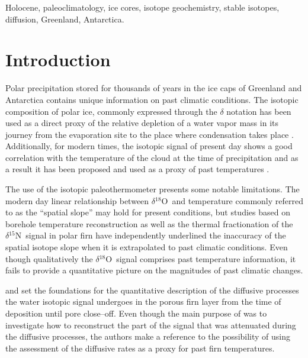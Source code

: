 \documentclass[11pt, draftcls, onecolumn]{IEEEtran} %
\numberwithin{equation}{section}
\numberwithin{table}{section}
\numberwithin{figure}{section}
\newcommand{\delOx}{$\delta{}^{18}\mathrm{O}$}
\newcommand{\delN}{$\delta{}^{15}\mathrm{N}$}
\begin{document}

\begin{IEEEkeywords} 
Holocene, paleoclimatology, ice cores, isotope geochemistry, stable isotopes, diffusion, Greenland, Antarctica.	
\end{IEEEkeywords}



\section{Introduction} %
\label{Intro}
Polar precipitation stored for thousands of years in the ice caps of Greenland and Antarctica
contains unique information on past climatic conditions. The isotopic composition 
of polar ice, commonly expressed
through the $\delta$ notation
has been used as a direct proxy of the relative depletion of a water vapor mass in its 
journey from the evaporation site to the place where condensation takes place \citep{Epstein1951, IAEA}. 
Additionally, for modern times, the isotopic signal of present day shows a good correlation with the temperature of the cloud at the
time of precipitation \citep{Dansgaard2, Dansgaard} and as a result it has been proposed and used 
as a proxy of past temperatures \citep{Jouzel1984, Jouzel1997, Johnsen2001}. 


The use of the isotopic paleothermometer presents some notable limitations.
The modern day linear relationship between \delOx~and temperature commonly referred to as the ``spatial slope''
may hold for present conditions, 
but studies based on borehole temperature reconstruction \citep{Cuffey1994, JOHNSEN1995a} 
as well as the thermal fractionation of the \delN~signal in polar firn 
\citep{Severinghaus1998, Severinghaus1999} have
independently underlined the inaccuracy of the spatial isotope slope when it is extrapolated to past climatic 
conditions. 
Even though qualitatively the \delOx~signal comprises past temperature information, it fails
to provide a quantitative picture on the magnitudes of past climatic changes.

\cite{Johnsen1977, WhillansGrootes1985} and \cite{Johnsen2000} set the foundations for the quantitative description 
of the diffusive processes the water isotopic signal undergoes in the porous firn layer from the time
of deposition until pore close--off. Even though the main purpose of \cite{Johnsen2000} was to investigate
how to reconstruct the part of the signal that was attenuated during the diffusive processes, the authors
make a reference to the possibility of using the assessment of the diffusive rates as a proxy for
past firn temperatures. 
\end{document}
